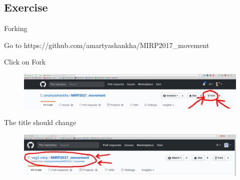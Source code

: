 \subsection{Exercise}
\begin{frame}[fragile]{Forking}{}
    \begin{block}{}
        Go to https://github.com/amartyashankha/MIRP2017\_movement
    \end{block}
    \begin{block}{Click on Fork}
        \begin{figure}
            \begin{center}
                \includegraphics[width=\linewidth]{images/git_fork.png}
            \end{center}
        \end{figure}
    \end{block}
    \begin{block}{The title should change}
        \begin{figure}
            \begin{center}
                \includegraphics[width=\linewidth]{images/git_forked.png}
            \end{center}
        \end{figure}
    \end{block}
\end{frame}

